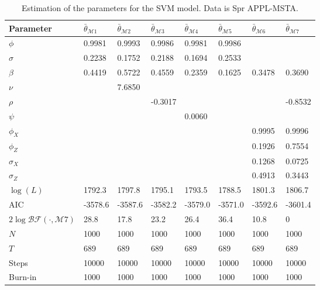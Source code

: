 \documentclass[11pt,a4,twosided,singlespacing,titlepagenumber=on]{scrreprt}
\numberwithin{equation}{chapter} %
\theoremstyle{remark}
\begin{document}
\begin{table}[htb]
\centering
\begin{tabular}{llllllll}
\label{estimation_of_svm_appl}
Parameter        & $\bar{\theta}_{\mathcal{M}1}$ & $\bar{\theta}_{\mathcal{M}2}$ & $\bar{\theta}_{\mathcal{M}3}$ & $\bar{\theta}_{\mathcal{M}4}$ & $\bar{\theta}_{\mathcal{M}5}$ & $\bar{\theta}_{\mathcal{M}6}$& $\bar{\theta}_{\mathcal{M}7}$\\ 
\hline
$\phi$								                  & 0.9981  & 0.9993 & 0.9986  & 0.9981  & 0.9986 & \\
$\sigma$                                & 0.2238  & 0.1752 & 0.2188  & 0.1694  & 0.2533 & \\
$\beta$                                 & 0.4419  & 0.5722 & 0.4559  & 0.2359  & 0.1625 & 0.3478 & 0.3690\\
$\nu$                                   &         & 7.6850 &         &         &         &\\
$\rho$                                  &         &        & -0.3017 &         &         & & -0.8532\\
$\psi$                                  &         &        &         & 0.0060  &         & \\
$\phi_X$                                &         &        &         &         &         & 0.9995 & 0.9996\\
$\phi_Z$                                &         &        &         &         &         & 0.1926 & 0.7554\\
$\sigma_X$                              &         &        &         &         &         & 0.1268 & 0.0725\\
$\sigma_Z$                              &         &        &         &         &         & 0.4913 & 0.3443\\
$\log(L)$                               & 1792.3  & 1797.8 & 1795.1  & 1793.5  & 1788.5  & 1801.3 & 1806.7\\
AIC                                     & -3578.6 & -3587.6& -3582.2 & -3579.0 & -3571.0 & -3592.6 & -3601.4\\
$2 \log \mathcal{BF}(\cdot, \mathcal{M}7)$& 28.8    & 17.8      & 23.2    & 26.4    & 36.4    & 10.8 & 0 \\
$N$                                     & 1000    & 1000   & 1000    & 1000    & 1000    & 1000 & 1000\\
$T$                                     & 689     & 689    & 689     & 689     & 689     & 689 & 689\\
Steps                                   & 10000   & 10000  & 10000   & 10000   & 10000   & 10000& 10000\\
Burn-in                                 & 1000    & 1000   & 1000    & 1000    & 1000    & 1000 & 1000\\
\hline
\end{tabular}
\caption{Estimation of the parameters for the SVM model. Data is Spr APPL-MSTA.}
\end{table}
\end{document}
